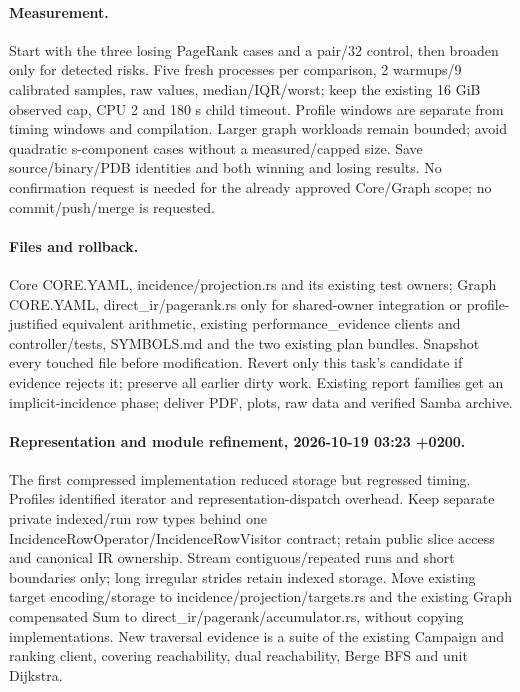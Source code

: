 \documentclass[11pt,a4paper]{article}
\begin{document}
\paragraph{Measurement.} Start with the three losing PageRank cases and a pair/32
control, then broaden only for detected risks. Five fresh processes per comparison,
2 warmups/9 calibrated samples, raw values, median/IQR/worst; keep the existing
16 GiB observed cap, CPU 2 and 180 s child timeout. Profile windows are separate
from timing windows and compilation. Larger graph workloads remain bounded; avoid
quadratic s-component cases without a measured/capped size. Save source/binary/PDB
identities and both winning and losing results. No confirmation request is needed
for the already approved Core/Graph scope; no commit/push/merge is requested.
\paragraph{Files and rollback.} Core CORE.YAML, incidence/projection.rs and its
existing test owners; Graph CORE.YAML, direct\_ir/pagerank.rs only for shared-owner
integration or profile-justified equivalent arithmetic, existing performance\_evidence
clients and controller/tests, SYMBOLS.md and the two existing plan bundles.
Snapshot every touched file before modification. Revert only this task's candidate
if evidence rejects it; preserve all earlier dirty work. Existing report families
get an implicit-incidence phase; deliver PDF, plots, raw data and verified Samba archive.

\paragraph{Representation and module refinement, 2026-10-19 03:23 +0200.}
The first compressed implementation reduced storage but regressed timing. Profiles
identified iterator and representation-dispatch overhead. Keep separate private
indexed/run row types behind one IncidenceRowOperator/IncidenceRowVisitor contract;
retain public slice access and canonical IR ownership. Stream contiguous/repeated
runs and short boundaries only; long irregular strides retain indexed storage.
Move existing target encoding/storage to incidence/projection/targets.rs and the
existing Graph compensated Sum to direct\_ir/pagerank/accumulator.rs, without copying
implementations. New traversal evidence is a suite of the existing Campaign and
ranking client, covering reachability, dual reachability, Berge BFS and unit Dijkstra.
\end{document}
